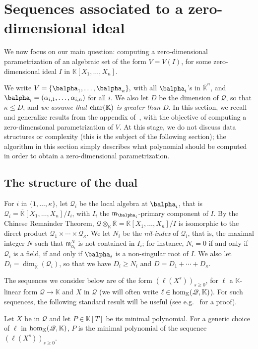 \documentclass[12pt]{article}
\newcommand{\lf}{X}
\newcommand{\residueI}{\mathscr{Q}}
\def\dg{\kappa}
\def\K{\mathbb{K}}
\def\K {\ensuremath{\mathbb{K}}}
\def\Kbar {{\ensuremath{\overline{\mathbb{K}}}}}
\def\D {\ensuremath{D}}
\def\m {\ensuremath{\mathfrak{m}}}
\begin{document}

\section{Sequences associated to a zero-dimensional ideal}\label{sec:seq0}

We now focus on our main question: computing a zero-dimensional
parametrization of an algebraic set of the form $V=V(I)$, for some
zero-dimensional ideal $I$ in $\K[X_1,\dots,X_n]$. 

We write $V=\{\balpha_1,\dots,\balpha_\dg\},$ with all $\balpha_i$'s in
$\Kbar^n$, and $\balpha_i=(\alpha_{i,1},\dots,\alpha_{i,n})$ for all
$i$.  We also let $\D$ be the dimension of $\residueI$, so that $\dg \le \D$,
and {\em we assume that ${\rm char}(\K)$ is greater than $D$}. In this
section, we recall and generalize results from the appendix
of~\cite{BoSaSc03}, with the objective of computing a zero-dimensional
parametrization of $V$. At this stage, we do not discuss data
structures or complexity (this is the subject of the following
section); the algorithm in this section simply describes what 
polynomial should be computed in order to obtain a zero-dimensional
parametrization.


\subsection{The structure of the dual}\label{ssec:dual}

For $i$ in $\{1,\dots,\dg\}$, let $\residueI_i$ be the local algebra at
$\balpha_i$, that is $\residueI_i=\Kbar[X_1,\dots,X_n]/I_i$, with $I_i$ the
$\m_{\balpha_i}$-primary component of $I$. By the Chinese Remainder
Theorem, $\residueI\otimes_\K \Kbar=\Kbar[X_1,\dots,X_n]/I$ is isomorphic to
the direct product $\residueI_1\times \cdots \times \residueI_\dg$.  We let $N_i$ be the
{\em nil-index} of $\residueI_i$, that is, the maximal integer $N$ such that
$\m_{\alpha_i}^N$ is not contained in $I_i$; for instance, $N_i=0$ if
and only if $\residueI_i$ is a field, if and only if $\balpha_i$ is a
non-singular root of $I$. We also let $\D_i=\dim_\Kbar(\residueI_i)$, so that
we have $D_i \ge N_i$ and $\D=\D_1 + \cdots + \D_\dg$.

The sequences we consider below are of the form $(\ell(\lf^s))_{s \ge
  0}$, for $\ell$ a $\K$-linear form $\residueI \to \K$ and $\lf$ in $\residueI$
(we will often write $\ell \in {\rm hom}_\K(\residueI,\K)$). For
such sequences, the following standard result will be useful
(see e.g.~\cite[Proposition~1 \& 2]{BoSaSc03} for a proof).
\begin{lemma}\label{lemma:minpoly}
  Let $\lf$ be in $\residueI$ and let $P \in \K[T]$ be its minimal
  polynomial. For a generic choice of $\ell$ in ${\rm hom}_\K(\residueI,\K)$,
  $P$ is the minimal polynomial of the sequence $(\ell(\lf^s))_{s \ge
    0}$.
\end{lemma}
\end{document}
